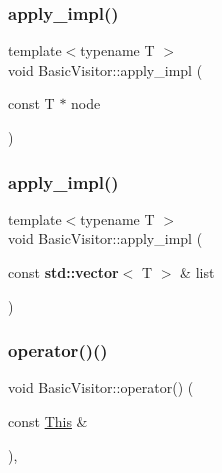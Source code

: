 \mbox{\label{struct_basic_visitor_aef8aa82a7e5149b6153f097af8daa647}} 
\subsubsection{\texorpdfstring{apply\+\_\+impl()}{apply\_impl()}\hspace{0.1cm}{\footnotesize\ttfamily [1/2]}}
{\footnotesize\ttfamily template$<$typename T $>$ \\
void Basic\+Visitor\+::apply\+\_\+impl (\begin{DoxyParamCaption}\item[{const T $\ast$}]{node }\end{DoxyParamCaption})\hspace{0.3cm}{\ttfamily [inline]}}

\mbox{\label{struct_basic_visitor_a128388a75069690c9c108ce87b69cde8}} 
\subsubsection{\texorpdfstring{apply\+\_\+impl()}{apply\_impl()}\hspace{0.1cm}{\footnotesize\ttfamily [2/2]}}
{\footnotesize\ttfamily template$<$typename T $>$ \\
void Basic\+Visitor\+::apply\+\_\+impl (\begin{DoxyParamCaption}\item[{const \textbf{ std\+::vector}$<$ T $>$ \&}]{list }\end{DoxyParamCaption})\hspace{0.3cm}{\ttfamily [inline]}}

\mbox{\label{struct_basic_visitor_a80dd293b132b869b59f1b87446a86354}} 
\subsubsection{\texorpdfstring{operator()()}{operator()()}\hspace{0.1cm}{\footnotesize\ttfamily [1/59]}}
{\footnotesize\ttfamily void Basic\+Visitor\+::operator() (\begin{DoxyParamCaption}\item[{const \hyperlink{struct_this}{This} \&}]{ }\end{DoxyParamCaption})\hspace{0.3cm}{\ttfamily [inline]}, {\ttfamily [virtual]}}



